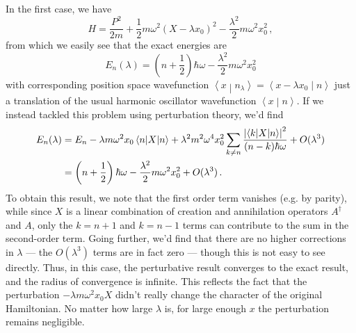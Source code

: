 \documentclass{article}
\theoremstyle{plain}\theoremheaderfont{\normalfont\itshape}\theorembodyfont{\rmfamily}\theoremseparator{.}\newtheorem*{rem}{Remark}\newtheorem*{ex}{Example}\newtheorem*{proof}{Proof}\newtheorem*{altp}{Alternative proof}
\theoremstyle{plain}\theoremheaderfont{\normalfont\bfseries}\theorembodyfont{\rmfamily}\theoremseparator{.}\newtheorem{thm}{Theorem}[section]\newtheorem{lem}[thm]{Lemma}\newtheorem{prop}[thm]{Proposition}\newtheorem*{cor}{Corollary}\newtheorem{defn}[thm]{Definition}\newtheorem{clm}[thm]{Claim}\newtheorem{clminproof}{Claim}
\theoremstyle{break}\theoremheaderfont{\normalfont\itshape}\theorembodyfont{\rmfamily}\theoremseparator{.\medskip}\newtheorem*{proofskip}{Proof}\newtheorem*{exs}{Examples}\newtheorem*{rems}{Remarks}
\theoremstyle{break}\theoremheaderfont{\normalfont\bfseries}\theorembodyfont{\rmfamily}\theoremseparator{.\medskip}\newtheorem{lemskip}[thm]{Lemma}\newtheorem{defnskip}[thm]{Definition}\newtheorem{propskip}[thm]{Proposition}\newtheorem{thmskip}[thm]{Theorem}
\numberwithin{equation}{section}
\newcommand{\braket}[2]{\left\langle #1 \middle| #2 \right\rangle}
\newcommand{\mel}[3]{\left\langle #1 \middle| #2 \middle| #3 \right\rangle}
\newcommand{\expval}[2]{\left\langle #2 \middle| #1 \middle| #2 \right\rangle}
\newcommand{\abs}[1]{\left| #1 \right|}
\begin{document}
    In the first case, we have
    \begin{equation}
        H=\frac{P^2}{2m}+\frac{1}{2}m\omega^2(X-\lambda x_0)^2-\frac{\lambda^2}{2}m\omega^2x_0^2\,,
    \end{equation}
    from which we easily see that the exact energies are
    \begin{equation}
        E_n(\lambda)=\left(n+\frac{1}{2}\right)\hbar\omega-\frac{\lambda^2}{2}m\omega^2 x_0^2
    \end{equation}
    with corresponding position space wavefunction \(\braket{x}{n_\lambda}=\braket{x-\lambda x_0}{n}\) just a translation of the usual harmonic oscillator wavefunction \(\braket{x}{n}\). If we instead tackled this problem using perturbation theory, we'd find
    \begin{align}
        E_n(\lambda)&=E_n-\lambda m\omega^2 x_0\expval{X}{n}+\lambda^2 m^2 \omega^4 x_0^2 \sum_{k\ne n}\frac{\abs{\mel{k}{X}{n}}^2}{(n-k)\hbar\omega}+O(\lambda^3)\notag\\
        &=\left(n+\frac{1}{2}\right)\hbar\omega-\frac{\lambda^2}{2}m\omega^2 x_0^2 +O(\lambda^3)\,.
    \end{align}
    To obtain this result, we note that the first order term vanishes (e.g. by parity), while since \(X\) is a linear combination of creation and annihilation operators \(A^\dagger\) and \(A\), only the \(k=n+1\) and \(k=n-1\) terms can contribute to the sum in the second-order term. Going further, we'd find that there are no higher corrections in \(\lambda\) --- the \(O(\lambda^3)\) terms are in fact zero --- though this is not easy to see directly. Thus, in this case, the perturbative result converges to the exact result, and the radius of convergence is infinite. This reflects the fact that the perturbation \(-\lambda m\omega^2 x_0X\) didn't really change the character of the original Hamiltonian. No matter how large \(\lambda\) is, for large enough \(x\) the perturbation remains negligible.
\end{document}
